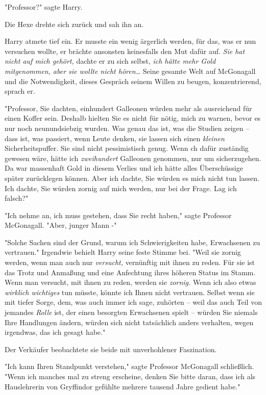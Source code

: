 {"Professor?" sagte Harry.

Die Hexe drehte sich zurück und sah ihn an.

Harry atmete tief ein. Er musste ein wenig ärgerlich werden, für das, was er nun versuchen wollte, er brächte ansonsten keinesfalls den Mut dafür auf. \emph{Sie hat nicht auf mich gehört,} dachte er zu sich selbst, \emph{ich hätte mehr Gold mitgenommen, aber sie wollte nicht hören…} Seine gesamte Welt auf McGonagall und die Notwendigkeit, dieses Gespräch seinem Willen zu beugen, konzentrierend, sprach er.

"Professor, Sie dachten, einhundert Galleonen würden mehr als ausreichend für einen Koffer sein. Deshalb hielten Sie es nicht für nötig, mich zu warnen, bevor es nur noch neunundsiebzig wurden. Was genau das ist, was die Studien zeigen -- dass ist, was passiert, wenn Leute denken, sie lassen sich einen \emph{kleinen} Sicherheitspuffer. Sie sind nicht pessimistisch genug. Wenn ch dafür zuständig gewesen wäre, hätte ich \emph{zweihundert} Galleonen genommen, nur um sicherzugehen. Da war massenhaft Gold in diesem Verlies und ich hätte alles Überschüssige später zurücklegen können. Aber ich dachte, Sie würden es mich nicht tun lassen. Ich dachte, Sie würden zornig auf mich werden, nur bei der Frage. Lag ich falsch?"

"Ich nehme an, ich muss gestehen, dass Sie recht haben," sagte Professor McGonagall. "Aber, junger Mann -"

"Solche Sachen sind der Grund, warum ich Schwierigkeiten habe, Erwachsenen zu vertrauen." Irgendwie behielt Harry seine feste Stimme bei. "Weil sie zornig werden, wenn man auch nur \emph{versucht,} vernünftig mit ihnen zu reden. Für sie ist das Trotz und Anmaßung und eine Anfechtung ihres höheren Status im Stamm. Wenn man versucht, mit ihnen zu reden, werden sie \emph{zornig.} Wenn ich also etwas \emph{wirklich wichtiges} tun müsste, könnte ich Ihnen nicht vertrauen. Selbst wenn sie mit tiefer Sorge, dem, was auch immer ich sage, zuhörten -- weil das auch Teil von jemandes \emph{Rolle} ist, der einen besorgten Erwachsenen spielt -- würden Sie niemals Ihre Handlungen ändern, würden sich nicht tatsächlich anders verhalten, wegen irgendwas, das ich gesagt habe."

Der Verkäufer beobachtete sie beide mit unverhohlener Faszination.

"Ich kann Ihren Standpunkt verstehen," sagte Professor McGonagall schließlich. "Wenn ich manches mal zu streng erscheine, denken Sie bitte daran, dass ich als Hauslehrerin von Gryffindor gefühlte mehrere tausend Jahre gedient habe."

}
